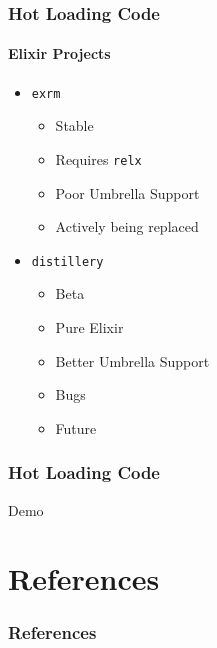 \documentclass{beamer}
\begin{document}
\begin{frame}
\frametitle{Hot Loading Code}
\framesubtitle{Elixir Projects}
\begin{itemize}
\item{\texttt{exrm}~\cite{website:bitwalker/exrm}}
\begin{itemize}
\item{Stable}
\item{Requires \texttt{relx}~\cite{website:erlware/relx}}
\item{Poor Umbrella Support}
\item{Actively being replaced}
\end{itemize}
\item{\texttt{distillery}~\cite{website:bitwalker/distillery}}
\begin{itemize}
\item{Beta}
\item{Pure Elixir}
\item{Better Umbrella Support}
\item{Bugs}
\item{Future}
\end{itemize}
\end{itemize}
\end{frame}

\begin{frame}
\frametitle{Hot Loading Code}
\Huge{Demo}
\end{frame}

\section*{References}
\begin{frame}[allowframebreaks]
\frametitle{References}
\nocite{*}
\renewcommand{\refname}{}


\end{frame}

\end{document}
